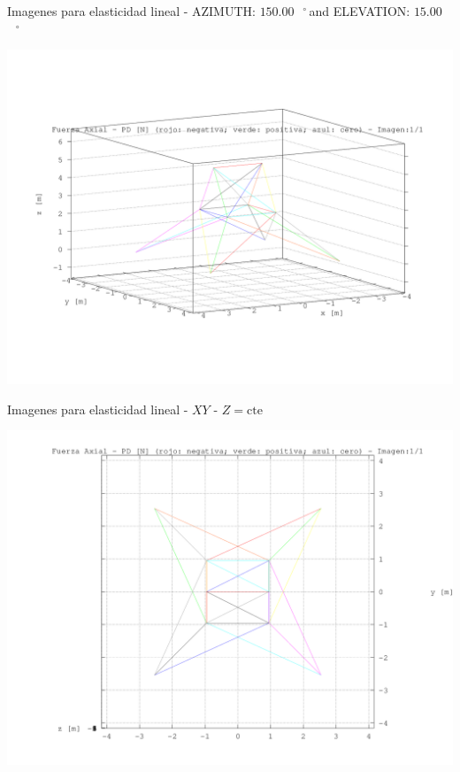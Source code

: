 \documentclass[a4paper,11pt]{article}
\newcommand{\grad}{\hspace{-2.5mm}$\,\phantom{a}^{\circ}\,$}
\begin{document}
\newpage       
\begin{center}       
Imagenes para elasticidad lineal - AZIMUTH: $150.00$\grad and ELEVATION: $ 15.00$\grad

\includegraphics[width=.80\textwidth]{../../fuerza_axial/torre_fuerza_axial_1.png}      

\end{center}       
\newpage       
\begin{center}       
Imagenes para elasticidad lineal -  $XY$ - $Z=\text{cte}$ 

\includegraphics[width=.80\textwidth]{../../XY_XZ_YZ/XY/fuerza_axial/torre_fuerza_axial_XY_1.png}      

\end{center}       
\newpage       
\end{document}
